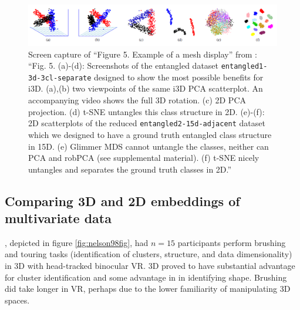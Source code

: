\documentclass{monashthesis}
\begin{document}
\begin{figure}

{\centering \includegraphics[width=1\linewidth]{./figures/sedlmair13fig} 

}

\caption{Screen capture of ``Figure 5. Example of a mesh
display'' from \textcite{sedlmair_empirical_2013}: ``Fig. 5. (a)-(d):
Screenshots of the entangled dataset \texttt{entangled1-3d-3cl-separate}
designed to show the most possible benefits for i3D. (a),(b) two
viewpoints of the same i3D PCA scatterplot. An accompanying video shows
the full 3D rotation. (c) 2D PCA projection. (d) t-SNE untangles this
class structure in 2D. (e)-(f): 2D scatterplots of the reduced
\texttt{entangled2-15d-adjacent} dataset which we designed to have a
ground truth entangled class structure in 15D. (e) Glimmer MDS cannot
untangle the classes, neither can PCA and robPCA (see supplemental
material). (f) t-SNE nicely untangles and separates the ground truth
classes in 2D.''}\label{fig:sedlmair13fig}
\end{figure}

\subsection{Comparing 3D and 2D embeddings of multivariate
data}\label{comparing-3d-and-2d-embeddings-of-multivariate-data}

\textcite{nelson_xgobi_1998}, depicted in figure \ref{fig:nelson98fig},
had \(n=15\) participants perform brushing and touring tasks
(identification of clusters, structure, and data dimensionality) in 3D
with head-tracked binocular VR. 3D proved to have substantial advantage
for cluster identification and some advantage in in identifying shape.
Brushing did take longer in VR, perhaps due to the lower familiarity of
manipulating 3D spaces.
\end{document}
